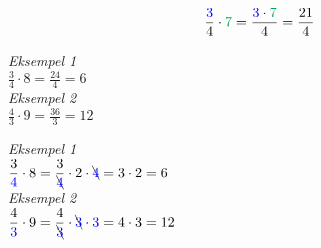 



\[ \frac{\colb{3}}{4}\cdot \colg{7}=\frac{\colb{3}\cdot\colg{7}}{4}=\frac{21}{4} \]



\textit{Eksempel 1} \\[5pt]
$ \displaystyle \frac{3}{4}\cdot 8 = \frac{24}{4}=6 $ \\[10pt]

\textit{Eksempel 2} \\[5pt]
$ \displaystyle \frac{4}{3}\cdot9 = \frac{36}{3}=12 $


\textit{Eksempel 1} \\[5pt]
$ \displaystyle \frac{3}{{\color{blue} 4}}\cdot 8 = \frac{3}{\bcancel{{\color{blue} 4}}}\cdot 2\cdot \bcancel{{\color{blue} 4}}=3\cdot2=6$ \\[10pt]

\textit{Eksempel 2} \\[5pt]
$ \displaystyle \frac{4}{{\color{blue} 3}}\cdot9 = \frac{4}{\bcancel{{\color{blue} 3}}}\cdot \bcancel{{\color{blue} 3}}\cdot{\color{blue} 3} =4\cdot3=12 $





